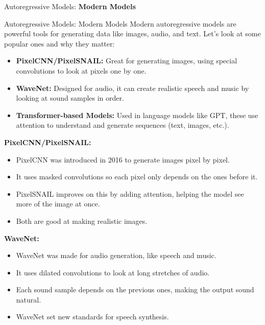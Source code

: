 \begin{frame}{}
    \centering
    \LARGE Autoregressive Models: \textbf{Modern Models}
\end{frame}

\begin{frame}[allowframebreaks]{Autoregressive Models: Modern Models}
    Modern autoregressive models are powerful tools for generating data like images, audio, and text. Let’s look at some popular ones and why they matter:

    \begin{itemize}
        \item \textbf{PixelCNN/PixelSNAIL:} Great for generating images, using special convolutions to look at pixels one by one.
        \item \textbf{WaveNet:} Designed for audio, it can create realistic speech and music by looking at sound samples in order.
        \item \textbf{Transformer-based Models:} Used in language models like GPT, these use attention to understand and generate sequences (text, images, etc.).
    \end{itemize}

    \framebreak

    \textbf{PixelCNN/PixelSNAIL:}
    \begin{itemize}
        \item PixelCNN was introduced in 2016 to generate images pixel by pixel.
        \item It uses masked convolutions so each pixel only depends on the ones before it.
        \item PixelSNAIL improves on this by adding attention, helping the model see more of the image at once.
        \item Both are good at making realistic images.
    \end{itemize}

    \framebreak

    \textbf{WaveNet:}
    \begin{itemize}
        \item WaveNet was made for audio generation, like speech and music.
        \item It uses dilated convolutions to look at long stretches of audio.
        \item Each sound sample depends on the previous ones, making the output sound natural.
        \item WaveNet set new standards for speech synthesis.
    \end{itemize}


\end{frame}

